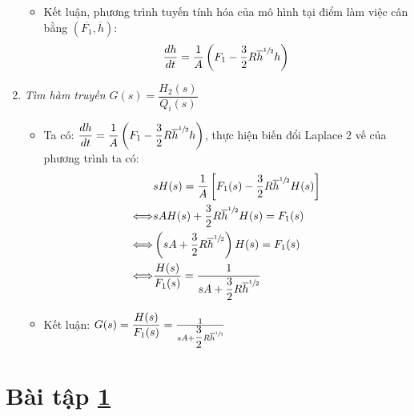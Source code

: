 \documentclass[12pt,a4paper]{article}
\begin{document}
\begin{enumerate}[\it a.]
\begin{itemize}
                    \item Kết luận, phương trình tuyến tính hóa của mô hình tại điểm làm việc cân bằng $\left({ \overline{F_1}, \overline{h} }\right)$:
                        \begin{align}
                            \dfrac{d h}{dt} = \dfrac{1}{A} \left({ F_1 - \dfrac{3}{2} R \overline{h} ^{\sfrac{1}{2}}  h}\right)
                        \end{align}
                \end{itemize}

            \item \textit{Tìm hàm truyền $G(s) = \dfrac{H_2(s)}{Q_i(s)}$}
                \begin{itemize}
                    \item Ta có: $\dfrac{d h}{dt} = \dfrac{1}{A} \left({ F_1 - \dfrac{3}{2} R \overline{h} ^{\sfrac{1}{2}}  h}\right)$, thực hiện biến đổi Laplace 2 vế của phương trình ta có:
                        \begin{align}
                            & s H(s) = \dfrac{1}{A} \left[{ F_1(s) - \dfrac{3}{2} R \overline{h} ^{\sfrac{1}{2}}  H(s)}\right]\\
                            \Longleftrightarrow & s A H(s) +  \dfrac{3}{2} R \overline{h} ^{\sfrac{1}{2}} H(s) = F_1(s)\\
                            \Longleftrightarrow & \left({ s A  + \dfrac{3}{2} R \overline{h} ^{\sfrac{1}{2}} }\right) H(s) = F_1(s) \\
                            \Longleftrightarrow & \dfrac{H(s)}{F_1(s)} = \frac{1}{s A  + \dfrac{3}{2} R \overline{h} ^{\sfrac{1}{2}}}
                        \end{align}

                    \item Kết luận: $G(s) = \dfrac{H(s)}{F_1(s)} = \frac{1}{s A  + \dfrac{3}{2} R \overline{h} ^{\sfrac{1}{2}}}$
                \end{itemize}
        \end{enumerate}

\section{Bài tập \ref{sec:baitap-2binh-1}} \label{sec:baitap-2binh-1}
\end{document}
